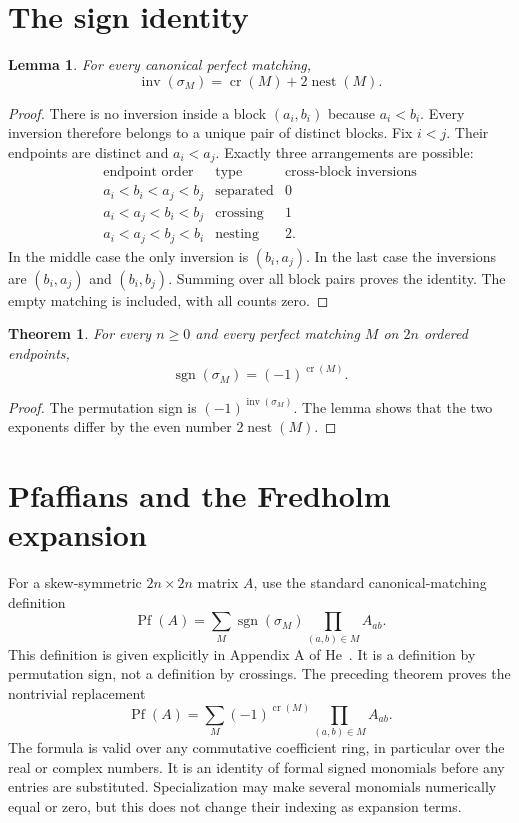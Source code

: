 \documentclass[11pt]{article}
\newtheorem{theorem}{Theorem}
\newtheorem{lemma}{Lemma}
\newcommand{\crs}{\operatorname{cr}}
\newcommand{\nest}{\operatorname{nest}}
\newcommand{\inv}{\operatorname{inv}}
\begin{document}
\section{The sign identity}
\begin{lemma}
For every canonical perfect matching,
\[
\inv(\sigma_M)=\crs(M)+2\nest(M).
\]
\end{lemma}
\begin{proof}
There is no inversion inside a block $(a_i,b_i)$ because $a_i<b_i$. Every inversion therefore belongs to a unique pair of distinct blocks. Fix $i<j$. Their endpoints are distinct and $a_i<a_j$. Exactly three arrangements are possible:
\[
\begin{array}{c|c|c}
\text{endpoint order}&\text{type}&\text{cross-block inversions}\\\hline
 a_i<b_i<a_j<b_j&\text{separated}&0\\
 a_i<a_j<b_i<b_j&\text{crossing}&1\\
 a_i<a_j<b_j<b_i&\text{nesting}&2.
\end{array}
\]
In the middle case the only inversion is $(b_i,a_j)$. In the last case the inversions are $(b_i,a_j)$ and $(b_i,b_j)$. Summing over all block pairs proves the identity. The empty matching is included, with all counts zero.
\end{proof}
\begin{theorem}
For every $n\geq0$ and every perfect matching $M$ on $2n$ ordered endpoints,
\[
\operatorname{sgn}(\sigma_M)=(-1)^{\crs(M)}.
\]
\end{theorem}
\begin{proof}
The permutation sign is $(-1)^{\inv(\sigma_M)}$. The lemma shows that the two exponents differ by the even number $2\nest(M)$.
\end{proof}

\section{Pfaffians and the Fredholm expansion}
For a skew-symmetric $2n\times2n$ matrix $A$, use the standard canonical-matching definition
\begin{equation}\label{pf}
\operatorname{Pf}(A)=\sum_{M}\operatorname{sgn}(\sigma_M)
                     \prod_{(a,b)\in M} A_{ab}.
\end{equation}
This definition is given explicitly in Appendix A of He~\cite{he}. It is a definition by permutation sign, not a definition by crossings. The preceding theorem proves the nontrivial replacement
\[
\operatorname{Pf}(A)=\sum_M(-1)^{\crs(M)}\prod_{(a,b)\in M}A_{ab}.
\]
The formula is valid over any commutative coefficient ring, in particular over the real or complex numbers. It is an identity of formal signed monomials before any entries are substituted. Specialization may make several monomials numerically equal or zero, but this does not change their indexing as expansion terms.
\end{document}
